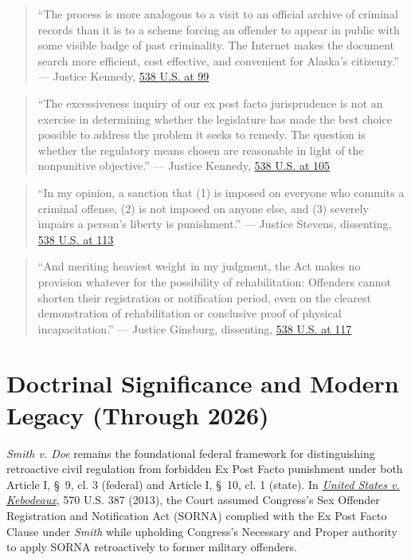 \documentclass[12pt]{article}
\begin{document}
\begin{quote}
``The process is more analogous to a visit to an official archive of criminal records than it is to a scheme forcing an offender to appear in public with some visible badge of past criminality. The Internet makes the document search more efficient, cost effective, and convenient for Alaska's citizenry.'' --- Justice Kennedy, \href{https://www.law.cornell.edu/supct/html/01-729.ZO.html}{538 U.S. at 99}
\end{quote}

\begin{quote}
``The excessiveness inquiry of our ex post facto jurisprudence is not an exercise in determining whether the legislature has made the best choice possible to address the problem it seeks to remedy. The question is whether the regulatory means chosen are reasonable in light of the nonpunitive objective.'' --- Justice Kennedy, \href{https://www.law.cornell.edu/supct/html/01-729.ZO.html}{538 U.S. at 105}
\end{quote}

\begin{quote}
``In my opinion, a sanction that (1) is imposed on everyone who commits a criminal offense, (2) is not imposed on anyone else, and (3) severely impairs a person's liberty is punishment.'' --- Justice Stevens, dissenting, \href{https://www.law.cornell.edu/supct/html/01-729.ZD.html}{538 U.S. at 113}
\end{quote}

\begin{quote}
``And meriting heaviest weight in my judgment, the Act makes no provision whatever for the possibility of rehabilitation: Offenders cannot shorten their registration or notification period, even on the clearest demonstration of rehabilitation or conclusive proof of physical incapacitation.'' --- Justice Ginsburg, dissenting, \href{https://www.law.cornell.edu/supct/html/01-729.ZD1.html}{538 U.S. at 117}
\end{quote}

\section{Doctrinal Significance and Modern Legacy (Through 2026)}
\textit{Smith v. Doe} remains the foundational federal framework for distinguishing retroactive civil regulation from forbidden Ex Post Facto punishment under both Article I, \S\ 9, cl. 3 (federal) and Article I, \S\ 10, cl. 1 (state). In \href{https://www.law.cornell.edu/supremecourt/text/12-418}{\textit{United States v. Kebodeaux}}, 570 U.S. 387 (2013), the Court assumed Congress's Sex Offender Registration and Notification Act (SORNA) complied with the Ex Post Facto Clause under \textit{Smith} while upholding Congress's Necessary and Proper authority to apply SORNA retroactively to former military offenders.
\end{document}
